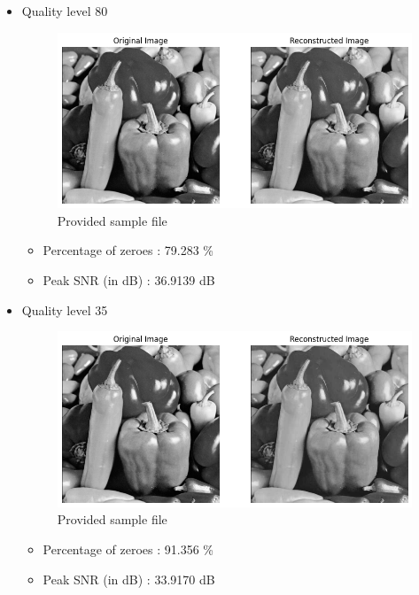\documentclass[11pt,a4paper]{article}
\begin{document}
\begin{itemize}
    \item Quality level 80
    {\begin{figure}[h]
        \centering
        \includegraphics[width=1.0\linewidth]{images/im3q1.png}
        \caption{Provided sample file}
    \end{figure}}

    \begin{itemize}
        \item Percentage of zeroes : 79.283 \%
        \item Peak SNR (in dB)     : 36.9139 dB
    \end{itemize}



    \item Quality level 35
    {\begin{figure}[h]
        \centering
        \includegraphics[width=1.0\linewidth]{images/im3q2.png}
        \caption{Provided sample file}
    \end{figure}}

    \begin{itemize}
        \item Percentage of zeroes : 91.356 \%
        \item Peak SNR (in dB)     : 33.9170 dB
    \end{itemize}


\end{itemize}
\end{document}
